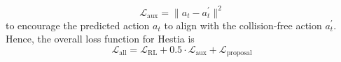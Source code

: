 \begin{equation}
\mathcal{L}_{\text{aux}} = \|a_t - a^{'}_t\|^2
\end{equation}
to encourage the predicted action $a_t$ to align with the collision-free action $a^{'}_t$.  
Hence, the overall loss function for Hestia is %
\begin{equation}
\mathcal{L}_\text{all} = \mathcal{L}_{\text{RL}} + 0.5 \cdot \mathcal{L}_{\text{aux}} + \mathcal{L}_{\text{proposal}}
\end{equation}